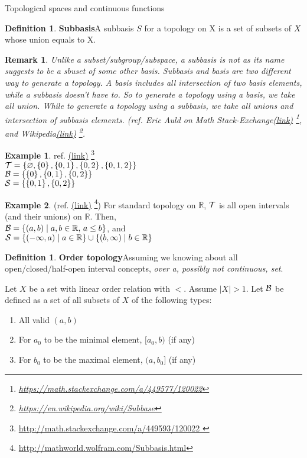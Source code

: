 \documentclass{report}
\let\emptyset\varnothing
\newcommand*{\link}[1]{\href{#1}{(\underline{link})}%
  \footnote{\url{#1}}}
\newtheorem*{remark}{Remark}
\theoremstyle{definition}
\newtheorem{definition}[theorem]{Definition}
\newtheorem{example}{Example}[theorem]
\newcommand{\defn}[1]{\textbf{#1}\label{#1}\index{#1}}
\newcommand{\set}[1]{\ensuremath\left\{#1\right\}}
\newcommand{\RR}{\mathbb{R}}
\begin{document}
\begin{chapter}{Topological spaces and continuous functions}
  \begin{definition}\defn{Subbasis}
    A subbasis $S$ for a topology on X is a set of subsets of $X$
    whose union equals to X.
  \end{definition}
  \begin{remark}
    Unlike a subset/subgroup/subspace, a subbasis is not as its name
    suggests to be a sbuset of some other basis. Subbasis and basis
    are two different way to generate a topology. A basis includes all
    intersection of two basis elements, while a subbasis doesn't have
    to. So to generate a topology using a basis, we take all
    union. While to generate a topology using a subbasis, we take all
    unions and intersection of subbasis elements. (ref. {Eric Auld on
      Math
      Stack-Exchange\link{https://math.stackexchange.com/a/449577/120022}},
    and Wikipedia\link{https://en.wikipedia.org/wiki/Subbase}.
  \end{remark}
  \begin{example}ref. \link{http://math.stackexchange.com/a/449593/120022
     }\\
    $\T=\set{\emptyset, \set{0}, \set{0,1}, \set{0,2}, \set{0,1,2}}$
    \\
    $\B=\set{\set{0},\set{0,1},\set{0,2}}$ \\
    $\mathcal{S}=\set{\set{0,1},\set{0,2}}$
  \end{example}
  \begin{example}
    (ref. \link{http://mathworld.wolfram.com/Subbasis.html}) For standard topology on $\RR$, $\mathcal{T}$ is all open intervals (and
    their unions) on $\RR$. Then, \\
    $\B=\set{(a,b)\mid a,b\in\RR,\,a\leq b}$, and \\
    $\mathcal{S}=\set{(-\infty,a)\mid
      a\in\RR}\cup\set{(b,\infty)\mid b\in \RR}$ \\

  \end{example}

  \begin{definition}\defn{Order topology}
    Assuming we knowing about all open/closed/half-open interval
    concepts, \emph{over a, possibly not continuous, set}.

    Let $X$ be a set with linear order relation with $<$. Assume
    $|X|>1$. Let $\mathcal{B}$ be defined as a set of all subsets of $X$ of the
    following types:
    \begin{enumerate}
    \item All valid $(a,b)$
    \item For $a_0$ to be the minimal element, $[a_0,b)$ (if any)
    \item For $b_0$ to be the maximal element, $(a,b_0]$ (if any)
    \end{enumerate}


\end{definition}
\end{chapter}
\end{document}
